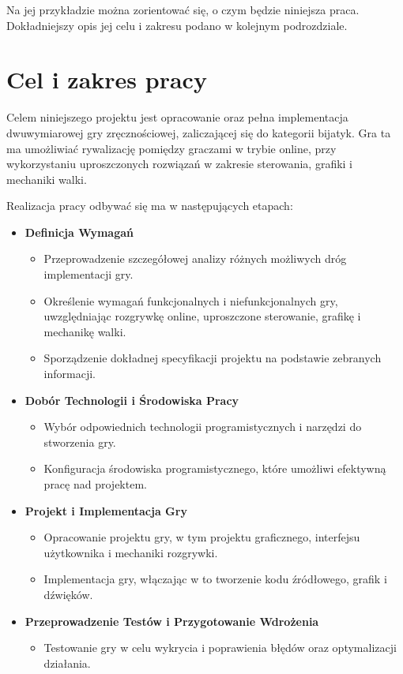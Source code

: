 Na jej przykładzie można zorientować się, o czym będzie niniejsza praca. Dokładniejszy opis jej celu i zakresu podano w kolejnym podrozdziale.

\section{Cel i zakres pracy}
Celem niniejszego projektu jest opracowanie oraz pełna implementacja dwuwymiarowej gry zręcznościowej, zaliczającej się do kategorii bijatyk. Gra ta ma umożliwiać rywalizację pomiędzy graczami w trybie online, przy wykorzystaniu uproszczonych rozwiązań w zakresie sterowania, grafiki i mechaniki walki.

Realizacja pracy odbywać się ma w następujących etapach:
\begin{itemize}
\item \textbf{Definicja Wymagań}
\begin{itemize}
	\item Przeprowadzenie szczegółowej analizy różnych możliwych dróg implementacji gry.
	\item Określenie wymagań funkcjonalnych i niefunkcjonalnych gry, uwzględniając rozgrywkę online, uproszczone sterowanie, grafikę i mechanikę walki.
	\item Sporządzenie dokładnej specyfikacji projektu na podstawie zebranych informacji.
\end{itemize}
\item \textbf{Dobór Technologii i Środowiska Pracy}
\begin{itemize}
	\item Wybór odpowiednich technologii programistycznych i narzędzi do stworzenia gry.
	\item Konfiguracja środowiska programistycznego, które umożliwi efektywną pracę nad projektem.
\end{itemize}
\item \textbf{Projekt i Implementacja Gry}
\begin{itemize}
	\item Opracowanie projektu gry, w tym projektu graficznego, interfejsu użytkownika i mechaniki rozgrywki.
	\item Implementacja gry, włączając w to tworzenie kodu źródłowego, grafik i dźwięków.
\end{itemize}
\item \textbf{Przeprowadzenie Testów i Przygotowanie Wdrożenia}
\begin{itemize}
	\item Testowanie gry w celu wykrycia i poprawienia błędów oraz optymalizacji działania.

\end{itemize}
\end{itemize}
